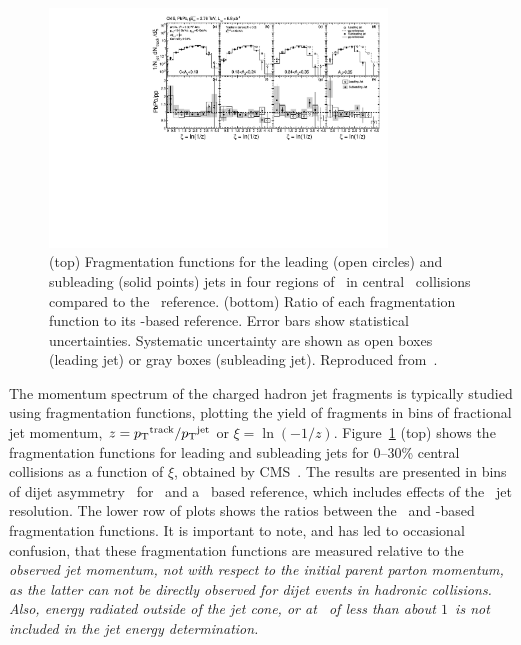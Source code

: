 \begin{figure}[!ht]
\begin{center}
\includegraphics[width=0.8\textwidth]{jetfigures/xsi_div_both_effv9_l100s40_0to12_dphi20eta20dr3pt4id1_cwt_ppDiv_gray.pdf}
\caption{(top) Fragmentation functions for the leading (open circles) and subleading (solid points)
jets in four regions of \AJ\ in central \PbPb\ collisions compared to the \pp\ reference.
(bottom) Ratio of each fragmentation function to its \pp-based reference.
Error bars show statistical uncertainties. Systematic uncertainty are
shown as open boxes (leading jet) or gray boxes (subleading jet).
Reproduced from~\cite{Chatrchyan:2012gw}.
}

\label{fig:GR:CMS_jetFF}
\end{center}
\end{figure}
The momentum spectrum of the charged hadron jet fragments is typically
studied using fragmentation functions, plotting the yield of fragments
in bins of fractional jet momentum, $z = \mbox{$p_{\mathrm{T}}$}^{\rm{track}} / \mbox{$p_{\mathrm{T}}$}^{\rm{jet}}$ or
$\xi = \ln(-1/z)$.
Figure~\ref{fig:GR:CMS_jetFF} (top) shows the fragmentation functions
for leading and subleading jets for 0--30\% central collisions as a function
of $\xi$, obtained
by CMS~\cite{Chatrchyan:2012gw}. The results are presented in bins of
dijet asymmetry \AJ\ for \PbPb\ and a \pp\ based reference,
which includes effects of the \PbPb\ jet resolution.
The lower row of plots shows the ratios between the \PbPb\
and \pp-based fragmentation functions. It is important to note, and has
led to occasional confusion, that these fragmentation functions are
measured relative to the \em observed \em jet momentum, not with respect
to the initial parent parton momentum, as the latter can not be directly observed
for dijet events in hadronic collisions.
Also, energy radiated outside of the jet cone, or at \pT\ of less than about $1$\GeVc\
is not included in the jet energy determination.

